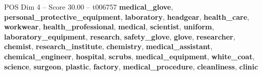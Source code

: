 \begin{textsample}{POS Dim 4 – Score 30.00 – t006757}  \label{ex:f4_pos_009}
\textbf{medical\_glove}, \textbf{personal\_protective\_equipment}, \textbf{laboratory}, \textbf{headgear}, \textbf{health\_care}, \textbf{workwear}, \textbf{health\_professional}, \textbf{medical}, \textbf{scientist}, \textbf{uniform}, \textbf{laboratory\_equipment}, \textbf{research}, \textbf{safety\_glove}, \textbf{glove}, \textbf{researcher}, \textbf{chemist}, \textbf{research\_institute}, \textbf{chemistry}, \textbf{medical\_assistant}, \textbf{chemical\_engineer}, \textbf{hospital}, \textbf{scrubs}, \textbf{medical\_equipment}, \textbf{white\_coat}, \textbf{science}, \textbf{surgeon}, \textbf{plastic}, \textbf{factory}, \textbf{medical\_procedure}, \textbf{cleanliness}, \textbf{clinic}

\end{textsample}
